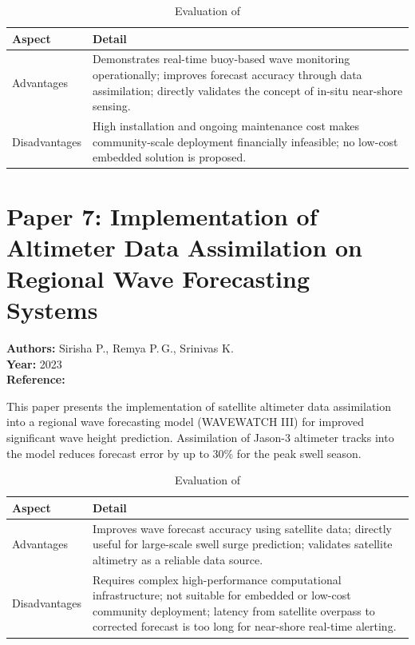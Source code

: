 \begin{table}[H]
\centering
\caption{Evaluation of \cite{balakrishnannair2025buoy}}
\label{tab:paper6}
\begin{tabularx}{\textwidth}{lX}
\toprule
\textbf{Aspect} & \textbf{Detail} \\
\midrule
Advantages &
  Demonstrates real-time buoy-based wave monitoring operationally;
  improves forecast accuracy through data assimilation;
  directly validates the concept of in-situ near-shore sensing. \\
\addlinespace
Disadvantages &
  High installation and ongoing maintenance cost makes community-scale
  deployment financially infeasible;
  no low-cost embedded solution is proposed. \\
\bottomrule
\end{tabularx}
\end{table}

\section{Paper 7: Implementation of Altimeter Data Assimilation on Regional Wave
         Forecasting Systems}

\textbf{Authors:} Sirisha P., Remya P.\,G., Srinivas K.\\
\textbf{Year:} 2023\\
\textbf{Reference:} \cite{sirisha2023altimeter}

This paper presents the implementation of satellite altimeter data assimilation into a
regional wave forecasting model (WAVEWATCH III) for improved significant wave height
prediction.
Assimilation of Jason-3 altimeter tracks into the model reduces forecast error by up
to 30\% for the peak swell season.

\begin{table}[H]
\centering
\caption{Evaluation of \cite{sirisha2023altimeter}}
\label{tab:paper7}
\begin{tabularx}{\textwidth}{lX}
\toprule
\textbf{Aspect} & \textbf{Detail} \\
\midrule
Advantages &
  Improves wave forecast accuracy using satellite data;
  directly useful for large-scale swell surge prediction;
  validates satellite altimetry as a reliable data source. \\
\addlinespace
Disadvantages &
  Requires complex high-performance computational infrastructure;
  not suitable for embedded or low-cost community deployment;
  latency from satellite overpass to corrected forecast is too long for
  near-shore real-time alerting. \\
\bottomrule
\end{tabularx}
\end{table}

